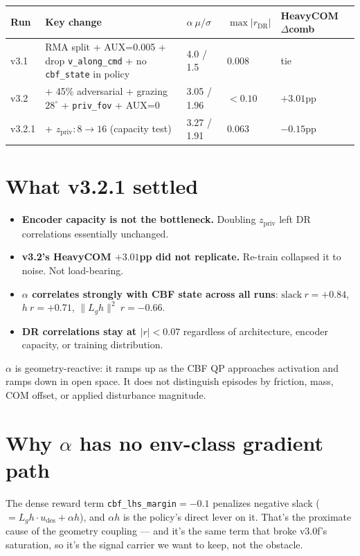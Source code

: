 \documentclass[11pt]{article}
\begin{document}
\begin{center}
\begin{tabular}{@{}l p{2.5in} l l l@{}}
\toprule
Run & Key change & $\alpha\ \mu/\sigma$ & $\max |r_{\text{DR}}|$ & HeavyCOM $\Delta$comb \\
\midrule
v3.1   & RMA split + AUX=0.005 + drop \texttt{v\_along\_cmd} + no \texttt{cbf\_state} in policy & 4.0 / 1.5  & 0.008 & tie \\
v3.2   & + 45\% adversarial + grazing $28^\circ$ + \texttt{priv\_fov} + AUX=0                  & 3.05 / 1.96 & $<0.10$ & $+3.01$pp \\
v3.2.1 & + $z_{\text{priv}}: 8 \to 16$ (capacity test)                                           & 3.27 / 1.91 & 0.063 & $-0.15$pp \\
\bottomrule
\end{tabular}
\end{center}

\section*{What v3.2.1 settled}

\begin{itemize}
\item \textbf{Encoder capacity is not the bottleneck.} Doubling $z_{\text{priv}}$ left DR correlations essentially unchanged.
\item \textbf{v3.2's HeavyCOM $+3.01$pp did not replicate.} Re-train collapsed it to noise. Not load-bearing.
\item \textbf{$\alpha$ correlates strongly with CBF state across all runs}: $\text{slack}\ r=+0.84$, $h\ r=+0.71$, $\|L_g h\|^2\ r=-0.66$.
\item \textbf{DR correlations stay at $|r| < 0.07$} regardless of architecture, encoder capacity, or training distribution.
\end{itemize}

$\alpha$ is geometry-reactive: it ramps up as the CBF QP approaches activation and ramps down in open space. It does not distinguish episodes by friction, mass, COM offset, or applied disturbance magnitude.

\section*{Why $\alpha$ has no env-class gradient path}

The dense reward term \texttt{cbf\_lhs\_margin}$=-0.1$ penalizes negative slack ($= L_g h \cdot u_{\text{des}} + \alpha h$), and $\alpha h$ is the policy's direct lever on it. That's the proximate cause of the geometry coupling --- and it's the same term that broke v3.0f's saturation, so it's the signal carrier we want to keep, not the obstacle.
\end{document}
